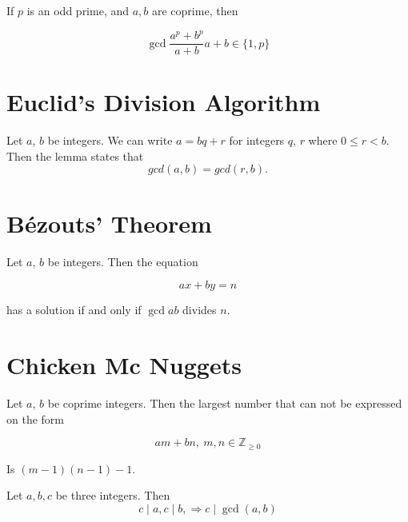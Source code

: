 \begin{lemma}
    If $p$ is an odd prime, and $a, b$ are coprime, then

    \[ \gcd{\frac{a^p+b^p}{a+b}}{a+b} \in \{1,p\}\]
\end{lemma}

\section{Euclid's Division Algorithm}

\begin{lemma}
    Let $a$, $b$ be integers. We can write $a = bq+r$ for integers $q$, $r$ where $0 \leq r < b$.
Then the lemma states that
\[gcd(a, b) = gcd(r, b).\]

\end{lemma}

\section{Bézouts' Theorem}

\begin{theorem}
Let $a$, $b$ be integers. Then the equation

\[ax+by=n\]

has a solution if and only if $\gcd{a}{b}$ divides $n$.
\end{theorem}

\section{Chicken Mc Nuggets}


\begin{theorem}
Let $a$, $b$ be coprime integers. Then the largest number that can not be expressed on the form 

\[am+bn, \ m,n \in \mathbb{Z}_{\geq 0}\]

Is $(m-1)(n-1)-1$.
\end{theorem}

\begin{definition}
    
\end{definition}

\begin{theorem}

Let $a,b,c$ be three integers. Then
\[c\mid a, c\mid b,\Rightarrow  c \mid \gcd(a,b)
\]

\end{theorem}

